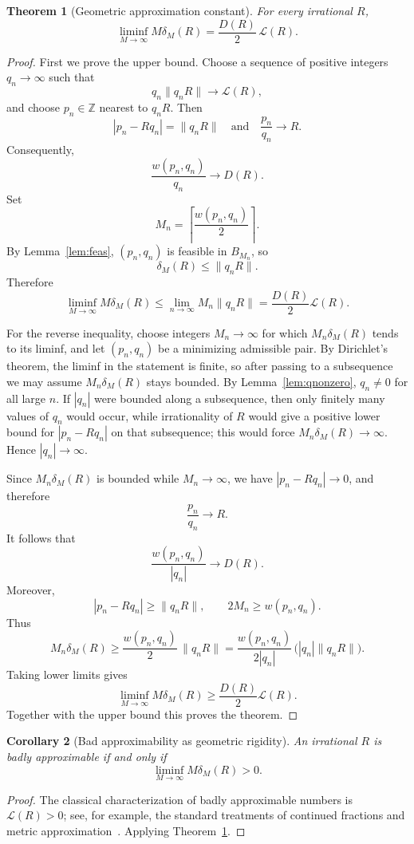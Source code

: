 \documentclass[11pt,a4paper]{article}
\newcommand{\deltam}{\delta_M}
\newtheorem{theorem}{Theorem}[section]
\newtheorem{corollary}[theorem]{Corollary}
\begin{document}
\begin{theorem}[Geometric approximation constant]\label{thm:lagrange}
For every irrational $R$,
\[
\boxed{
\liminf_{M\to\infty}M\deltam(R)=\frac{D(R)}2\,\mathcal L(R).
}
\]
\end{theorem}

\begin{proof}
First we prove the upper bound. Choose a sequence of positive integers $q_n\to\infty$ such that
\[
q_n\|q_nR\|\to\mathcal L(R),
\]
and choose $p_n\in\mathbb Z$ nearest to $q_nR$. Then
\[
|p_n-Rq_n|=\|q_nR\|
\quad\text{and}\quad
\frac{p_n}{q_n}\to R.
\]
Consequently,
\[
\frac{w(p_n,q_n)}{q_n}\to D(R).
\]
Set
\[
M_n=\left\lceil\frac{w(p_n,q_n)}2\right\rceil.
\]
By Lemma~\ref{lem:feas}, $(p_n,q_n)$ is feasible in $B_{M_n}$, so
\[
\deltam(R)\le\|q_nR\|.
\]
Therefore
\[
\liminf_{M\to\infty}M\deltam(R)
\le
\lim_{n\to\infty}M_n\|q_nR\|
=\frac{D(R)}2\mathcal L(R).
\]

For the reverse inequality, choose integers $M_n\to\infty$ for which
$M_n\deltam(R)$ tends to its liminf, and let $(p_n,q_n)$ be a minimizing admissible pair. By
Dirichlet's theorem, the liminf in the statement is finite, so after passing to a subsequence we
may assume $M_n\deltam(R)$ stays bounded. By Lemma~\ref{lem:qnonzero}, $q_n\ne0$ for all large $n$.
If $|q_n|$ were bounded along a subsequence, then only finitely many values of $q_n$ would occur,
while irrationality of $R$ would give a positive lower bound for $|p_n-Rq_n|$ on that subsequence;
this would force $M_n\deltam(R)\to\infty$. Hence $|q_n|\to\infty$.

Since $M_n\deltam(R)$ is bounded while $M_n\to\infty$, we have
$|p_n-Rq_n|\to0$, and therefore
\[
\frac{p_n}{q_n}\to R.
\]
It follows that
\[
\frac{w(p_n,q_n)}{|q_n|}\to D(R).
\]
Moreover,
\[
|p_n-Rq_n|\ge\|q_nR\|,
\qquad
2M_n\ge w(p_n,q_n).
\]
Thus
\[
M_n\deltam(R)
\ge
\frac{w(p_n,q_n)}2\,\|q_nR\|
=\frac{w(p_n,q_n)}{2|q_n|}\,\bigl(|q_n|\|q_nR\|\bigr).
\]
Taking lower limits gives
\[
\liminf_{M\to\infty}M\deltam(R)
\ge
\frac{D(R)}2\mathcal L(R).
\]
Together with the upper bound this proves the theorem.
\end{proof}

\begin{corollary}[Bad approximability as geometric rigidity]\label{cor:bad}
An irrational $R$ is badly approximable if and only if
\[
\liminf_{M\to\infty}M\deltam(R)>0.
\]
\end{corollary}

\begin{proof}
The classical characterization of badly approximable numbers is $\mathcal L(R)>0$; see, for example, the standard treatments of continued fractions and metric approximation~\cite{cassels,khintchine1924,harman1998}. Applying
Theorem~\ref{thm:lagrange}.
\end{proof}
\end{document}
